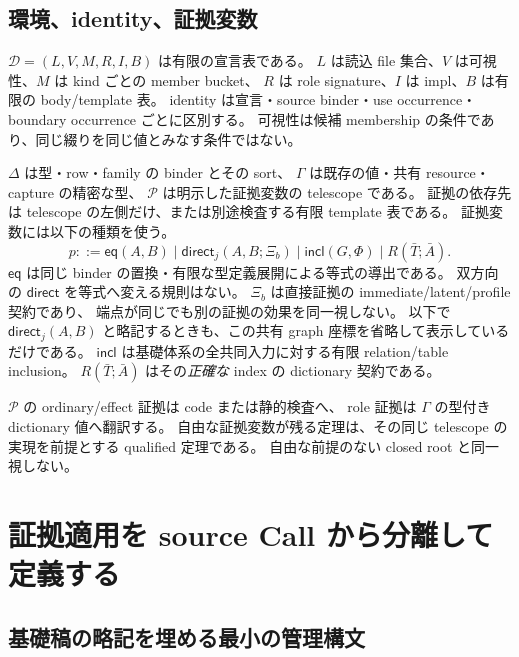 \documentclass[11pt,a4paper]{article}
\begin{document}
\subsection{環境、identity、証拠変数}

\(\mathcal D=(L,V,M,R,I,B)\) は有限の宣言表である。
\(L\) は読込 file 集合、\(V\) は可視性、\(M\) は kind ごとの member bucket、
\(R\) は role signature、\(I\) は impl、\(B\) は有限の body/template 表。
identity は宣言・source binder・use occurrence・boundary occurrence ごとに区別する。
可視性は候補 membership の条件であり、同じ綴りを同じ値とみなす条件ではない。

\(\Delta\) は型・row・family の binder とその sort、
\(\Gamma\) は既存の値・共有 resource・capture の精密な型、
\(\mathcal P\) は明示した証拠変数の telescope である。
証拠の依存先は telescope の左側だけ、または別途検査する有限 template 表である。
証拠変数には以下の種類を使う。
\[
 p::=\mathsf{eq}(A,B)\mid\mathsf{direct}_j(A,B;\Xi_b)
      \mid\mathsf{incl}(G,\Phi)\mid R(\bar T;\bar A).
\]
\(\mathsf{eq}\) は同じ binder の置換・有限な型定義展開による等式の導出である。
双方向の \(\mathsf{direct}\) を等式へ変える規則はない。
\(\Xi_b\) は直接証拠の immediate/latent/profile 契約であり、
端点が同じでも別の証拠の効果を同一視しない。
以下で \(\mathsf{direct}_j(A,B)\) と略記するときも、この共有 graph 座標を省略して表示しているだけである。
\(\mathsf{incl}\) は基礎体系の全共同入力に対する有限 relation/table inclusion。
\(R(\bar T;\bar A)\) はその\emph{正確な} index の dictionary 契約である。

\(\mathcal P\) の ordinary/effect 証拠は code または静的検査へ、
role 証拠は \(\Gamma\) の型付き dictionary 値へ翻訳する。
自由な証拠変数が残る定理は、その同じ telescope の実現を前提とする qualified 定理である。
自由な前提のない closed root と同一視しない。

\section{証拠適用を source Call から分離して定義する}
\label{sec:evidence-admin}

\subsection{基礎稿の略記を埋める最小の管理構文}
\end{document}
